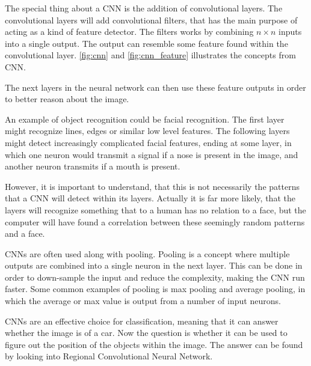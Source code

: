 The special thing about a CNN is the addition of convolutional layers.
The convolutional layers will add convolutional filters, that has the main purpose of acting as a kind of feature detector.
The filters works by combining $n \times n$ inputs into a single output.
The output can resemble some feature found within the convolutional layer.
\autoref{fig:cnn} and \autoref{fig:cnn_feature} illustrates the concepts from CNN.



The next layers in the neural network can then use these feature outputs in order to better reason about the image.

An example of object recognition could be facial recognition.
The first layer might recognize lines, edges or similar low level features.
The following layers might detect increasingly complicated facial features, ending at some layer, in which one neuron would transmit a signal if a nose is present in the image, and another neuron transmits if a mouth is present.


However, it is important to understand, that this is not necessarily the patterns that a CNN will detect within its layers.
Actually it is far more likely, that the layers will recognize something that to a human has no relation to a face, but the computer will have found a correlation between these seemingly random patterns and a face.

CNNs are often used along with pooling.
Pooling is a concept where multiple outputs are combined into a single neuron in the next layer.
This can be done in order to down-sample the input and reduce the complexity, making the CNN run faster.
Some common examples of pooling is max pooling and average pooling, in which the average or max value is output from a number of input neurons.

CNNs are an effective choice for classification, meaning that it can answer whether the image is of a car.
Now the question is whether it can be used to figure out the position of the objects within the image.
The answer can be found by looking into Regional Convolutional Neural Network.


